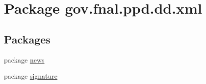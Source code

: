 \hypertarget{namespacegov_1_1fnal_1_1ppd_1_1dd_1_1xml}{\section{Package gov.\-fnal.\-ppd.\-dd.\-xml}
\label{namespacegov_1_1fnal_1_1ppd_1_1dd_1_1xml}
}
\subsection*{Packages}
\begin{DoxyCompactItemize}
\item 
package \hyperlink{namespacegov_1_1fnal_1_1ppd_1_1dd_1_1xml_1_1news}{news}
\item 
package \hyperlink{namespacegov_1_1fnal_1_1ppd_1_1dd_1_1xml_1_1signature}{signature}
\end{DoxyCompactItemize}
